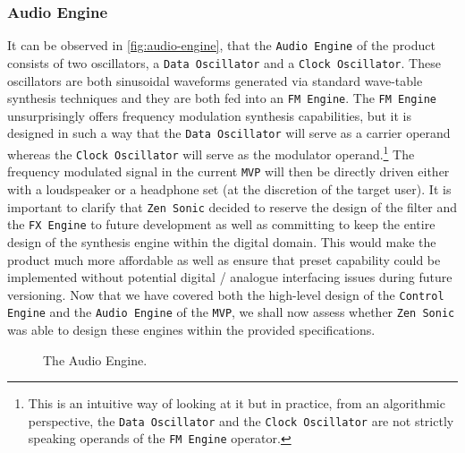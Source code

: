 \documentclass[12pt]{article}
\begin{document}
\subsubsection{Audio Engine}
It can be observed in \autoref{fig:audio-engine}, that the \texttt{Audio Engine} of the product consists of two oscillators, a \texttt{Data Oscillator} and a \texttt{Clock Oscillator}. These oscillators are both sinusoidal waveforms generated via standard wave-table synthesis techniques and they are both fed into an \texttt{FM Engine}. The \texttt{FM Engine} unsurprisingly offers frequency modulation synthesis capabilities, but it is designed in such a way that the \texttt{Data Oscillator} will serve as a carrier operand whereas the \texttt{Clock Oscillator} will serve as the modulator operand.\footnote{This is an intuitive way of looking at it but in practice, from an algorithmic perspective, the \texttt{Data Oscillator} and the \texttt{Clock Oscillator} are not strictly speaking operands of the \texttt{FM Engine} operator.} The frequency modulated signal in the current \texttt{MVP} will then be directly driven either with a loudspeaker or a headphone set (at the discretion of the target user). It is important to clarify that \texttt{Zen Sonic} decided to reserve the design of the filter and the \texttt{FX Engine} to future development as well as committing to keep the entire design of the synthesis engine within the digital domain. This would make the product much more affordable as well as ensure that preset capability could be implemented without potential digital / analogue interfacing issues during future versioning. Now that we have covered both the high-level design of the \texttt{Control Engine} and the \texttt{Audio Engine} of the \texttt{MVP}, we shall now assess whether \texttt{Zen Sonic} was able to design these engines within the provided specifications.
\begin{figure}[ht]
    \centering
    \caption{The Audio Engine.}
    \label{fig:audio-engine}
\end{figure}
\end{document}
